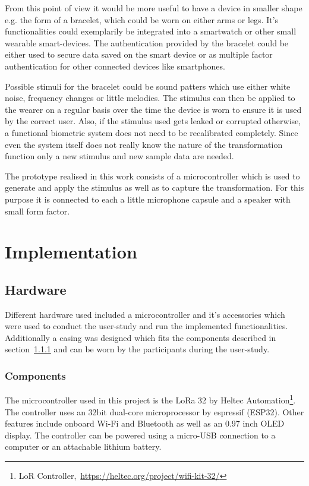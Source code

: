 From this point of view it would be more useful to have a device in smaller shape e.g. the form of a bracelet, which could be worn on either arms or legs.
It's functionalities could exemplarily be integrated into a smartwatch or other small wearable smart-devices. 
The authentication provided by the bracelet could be either used to secure data saved on the smart device or as multiple factor authentication for other connected devices like smartphones.

Possible stimuli for the bracelet could be sound patters which use either white noise, frequency changes or little melodies.
The stimulus can then be applied to the wearer on a regular basis over the time the device is worn to ensure it is used by the correct user.
Also, if the stimulus used gets leaked or corrupted otherwise, a functional biometric system does not need to be recalibrated completely.
Since even the system itself does not really know the nature of the transformation function only a new stimulus and new sample data are needed.

The prototype realised in this work consists of a microcontroller which is used to generate and apply the stimulus as well as to capture the transformation.
For this purpose it is connected to each a little microphone capsule and a speaker with small form factor.

\section{Implementation}

\subsection{Hardware}
Different hardware used included a microcontroller and it's accessories which were used to conduct the user-study and run the implemented functionalities.
Additionally a casing was designed which fits the components described in section~\ref{sssec::num1} and can be worn by the participants during the user-study.

\subsubsection{Components}\label{sssec::num1}
The microcontroller used in this project is the LoRa 32 by Heltec Automation\footnote{LoR Controller,~\url{https://heltec.org/project/wifi-kit-32/}}.
The controller uses an 32bit dual-core microprocessor by espressif (ESP32).
Other features include onboard Wi-Fi and Bluetooth as well as an 0.97 inch OLED display.
The controller can be powered using a micro-USB connection to a computer or an attachable lithium battery.

